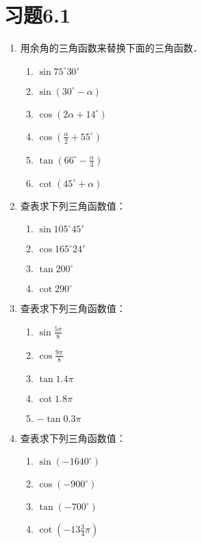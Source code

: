 \section*{习题6.1}
\begin{enumerate}
    \item 用余角的三角函数来替换下面的三角函数．
\begin{multicols}{2}
\begin{enumerate}
    \item $\sin75^{\circ}30'$
    \item $\sin(30^{\circ}-\alpha)$
    \item $\cos(2\alpha+14^{\circ})$
    \item $\cos\left(\frac{\alpha}{2}+55^{\circ}\right)$
    \item $\tan\left(66^{\circ}-\frac{\alpha}{3}\right)$
    \item $\cot(45^{\circ}+\alpha)$
\end{enumerate}
\end{multicols}
    \item 查表求下列三角函数值：
\begin{multicols}{2}
    \begin{enumerate}
        \item $\sin105^{\circ}45'$
        \item $\cos165^{\circ}24'$
        \item $\tan200^{\circ}$
        \item $\cot290^{\circ}$
    \end{enumerate}
    \end{multicols}
    \item 查表求下列三角函数值：
\begin{multicols}{2}
\begin{enumerate}
    \item $\sin\frac{5\pi}{8}$
    \item $\cos\frac{9\pi}{8}$
    \item $\tan 1.4\pi$
    \item $\cot 1.8\pi$
    \item $-\tan 0.3\pi$
\end{enumerate}
\end{multicols}

\item 查表求下列三角函数值：
\begin{multicols}{2}
\begin{enumerate}
    \item $\sin(-1640^{\circ})$
    \item $\cos(-900^{\circ})$
    \item $\tan(-700^{\circ})$
    \item $\cot\left(-13\frac{3}{4}\pi\right)$
\end{enumerate}
\end{multicols}


\end{enumerate}
